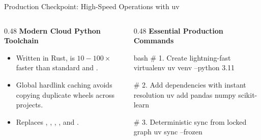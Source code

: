 \documentclass[../m00-session-04.tex]{subfiles}
\begin{document}
\begin{frame}[fragile]{Production Checkpoint: High-Speed Operations with uv}
  \begin{columns}[T,onlytextwidth]
    \begin{column}{0.48\textwidth}
      {\small\bfseries\color{UpGradNight}Modern Cloud Python Toolchain}\par\vspace{0.08cm}
      \begin{itemize}\setlength{\itemsep}{0.20em}\small
        \item Written in Rust, \textbf{} is $10-100\times$ faster than standard  and .
        \item Global hardlink caching avoids copying duplicate wheels across projects.
        \item Replaces , , , , and .
      \end{itemize}
      \vspace{0.04cm}
    \end{column}
    \hfill
    \begin{column}{0.48\textwidth}
      {\small\bfseries\color{UpGradRed}Essential Production Commands}\par\vspace{0.06cm}
\begin{CodeBlock}{bash}
# 1. Create lightning-fast virtualenv
uv venv --python 3.11

# 2. Add dependencies with instant resolution
uv add pandas numpy scikit-learn

# 3. Deterministic sync from locked graph
uv sync --frozen
\end{CodeBlock}
    \end{column}
  \end{columns}
\end{frame}
\end{document}
